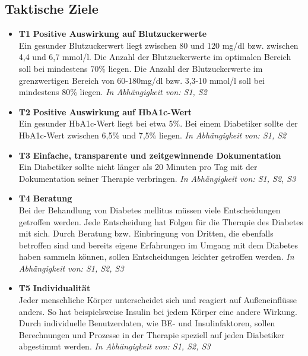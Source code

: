 \subsection{Taktische Ziele}
\begin{itemize}
	\item \lbrack \textbf{T1}\rbrack  \textbf{ Positive Auswirkung auf Blutzuckerwerte} \\
	Ein gesunder Blutzuckerwert liegt zwischen 80 und 120 mg/dl bzw. zwischen 4,4 und 6,7 mmol/l. Die Anzahl der Blutzuckerwerte im optimalen Bereich soll bei mindestens 70\% liegen. Die Anzahl der Blutzuckerwerte im grenzwertigen Bereich von 60-180mg/dl bzw. 3,3-10 mmol/l soll bei mindestens 80\% liegen.\newline
	\emph{In Abhängigkeit von: S1, S2} 
	\item \lbrack \textbf{T2}\rbrack  \textbf{ Positive Auswirkung auf HbA1c-Wert} \\
	Ein gesunder HbA1c-Wert liegt bei etwa 5\%. Bei einem Diabetiker sollte der HbA1c-Wert zwischen 6,5\% und 7,5\% liegen. \newline
	\emph{In Abhängigkeit von: S1, S2} 
	\item \lbrack \textbf{T3}\rbrack  \textbf{ Einfache, transparente und zeitgewinnende Dokumentation} \\
	Ein Diabetiker sollte nicht länger als 20 Minuten pro Tag mit der Dokumentation seiner Therapie verbringen.\newline
	\emph{In Abhängigkeit von: S1, S2, S3} 
	\item \lbrack \textbf{T4}\rbrack  \textbf{ Beratung} \\
	Bei der Behandlung von Diabetes mellitus müssen viele Entscheidungen getroffen werden. Jede Entscheidung hat Folgen für die Therapie des Diabetes mit sich. Durch Beratung bzw. Einbringung von Dritten, die ebenfalls betroffen sind und bereits eigene Erfahrungen im Umgang mit dem Diabetes haben sammeln können, sollen Entscheidungen leichter getroffen werden. \newline
	\emph{In Abhängigkeit von: S1, S2, S3} 
	\item \lbrack \textbf{T5}\rbrack  \textbf{ Individualität} \\  
	Jeder menschliche Körper unterscheidet sich und reagiert auf Außeneinflüsse anders. So hat beispielsweise Insulin bei jedem Körper eine andere Wirkung. Durch individuelle Benutzerdaten, wie BE- und Insulinfaktoren, sollen Berechnungen und Prozesse in der Therapie speziell auf jeden Diabetiker abgestimmt werden. \newline
	\emph{In Abhängigkeit von: S1, S2, S3} 
\end{itemize}

